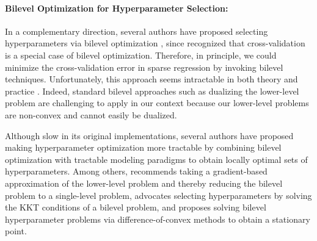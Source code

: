 \documentclass[mnsc,nonblindrev]{informs3} %
\begin{document}
\paragraph{Bilevel Optimization for Hyperparameter Selection:} In a complementary direction, several authors have proposed selecting hyperparameters via bilevel optimization \citep[see][for a general theory]{beck2021gentle}, since \cite{bennett2006model} %
recognized that cross-validation is a special case of bilevel optimization. 
Therefore, {\color{black}in principle, we could} minimize the {\color{black}cross-validation} error in sparse regression by invoking bilevel techniques. Unfortunately, this approach seems intractable in both theory and practice \citep[][]{ben1990computational, hansen1992new}. Indeed, standard bilevel approaches such as dualizing the lower-level problem are challenging to apply in our context because our lower-level problems are non-convex and cannot easily be dualized.

Although slow in its original implementations, several authors have proposed making hyperparameter optimization more tractable by combining bilevel optimization with tractable modeling paradigms to obtain locally optimal sets of hyperparameters. Among others, \cite{sinha2020gradient} recommends taking a gradient-based approximation of the lower-level problem and thereby reducing the bilevel problem to a single-level problem, \cite{okuno2021lp} advocates selecting hyperparameters by solving the KKT conditions of a bilevel problem, and \cite{ye2022difference} proposes solving bilevel hyperparameter problems via difference-of-convex methods to obtain a stationary point.%
\end{document}
